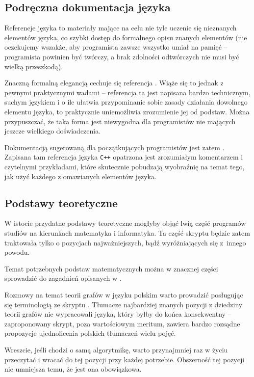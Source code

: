 \subsection{Podręczna dokumentacja języka}

Referencje języka to materiały mające na celu nie tyle uczenie się nieznanych
elementów języka, co szybki dostęp do formalnego opisu znanych elementów
(nie oczekujemy wszakże, aby programista zawsze wszystko umiał na pamięć
-- programista powinien być twórczy, a brak zdolności odtwórczych nie musi
być wielką przeszkodą).

Znaczną formalną elegancją cechuje się referencja . Wiąże
się to jednak z pewnymi praktycznymi wadami -- referencja ta jest napisana
bardzo technicznym, suchym językiem i o ile ułatwia przypominanie sobie zasady
działania dowolnego elementu języka, to praktycznie uniemożliwia zrozumienie
jej od podstaw. Można przypuszczać, że taka forma jest niewygodna dla
programistów nie mających jeszcze wielkiego doświadczenia.

Dokumentacją sugerowaną dla początkujących programistów jest zatem
. Zapisana tam referencja języka \texttt{C++}
opatrzona jest zrozumiałym komentarzem i czytelnymi przykładami, które
skutecznie pobudzają wyobraźnię na temat tego, jak użyć każdego z omawianych
elementów języka.

\subsection{Podstawy teoretyczne}

W istocie przydatne podstawy teoretyczne mogłyby objąć lwią część programów
studiów na kierunkach matematyka i informatyka. Ta część skryptu będzie zatem
traktowała tylko o pozycjach najważniejszych, bądź wyróżniających się z~innego
powodu.

Temat potrzebnych podstaw matematycznych można w znacznej części sprowadzić do
zagadnień opisanych w .

Rozmowy na temat teorii grafów w języku polskim warto prowadzić posługując się
terminologią ze skryptu . Tłumacze najbardziej znanych
pozycji z dziedziny teorii grafów nie wypracowali języka, który byłby do końca
konsekwentny -- zaproponowany skrypt, poza wartościowym meritum, zawiera bardzo
rozsądne propozycje ujednolicenia polskich tłumaczeń wielu pojęć.

Wreszcie, jeśli chodzi o samą algorytmikę, warto przynajmniej raz w życiu
przeczytać  i wracać do tej pozycji przy każdej potrzebie.
Obszerność tej pozycji nie umniejsza temu, że jest ona obowiązkowa.

